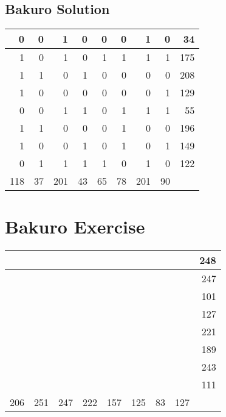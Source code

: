 \documentclass[]{article}
\begin{document}
 \subsection{Bakuro Solution} 
\begin{tabular}{rrrrrrrrr}
\hline
   0 &  0 &   1 &  0 &  0 &  0 &   1 &  0 &  34 \\ \hline
   1 &  0 &   1 &  0 &  1 &  1 &   1 &  1 & 175 \\ \hline
   1 &  1 &   0 &  1 &  0 &  0 &   0 &  0 & 208 \\ \hline
   1 &  0 &   0 &  0 &  0 &  0 &   0 &  1 & 129 \\ \hline
   0 &  0 &   1 &  1 &  0 &  1 &   1 &  1 &  55 \\ \hline
   1 &  1 &   0 &  0 &  0 &  1 &   0 &  0 & 196 \\ \hline
   1 &  0 &   0 &  1 &  0 &  1 &   0 &  1 & 149 \\ \hline
   0 &  1 &   1 &  1 &  1 &  0 &   1 &  0 & 122 \\ \hline
 118 & 37 & 201 & 43 & 65 & 78 & 201 & 90 &     \\ \hline
\hline
\end{tabular}\newpage\section{Bakuro Exercise}\begin{tabular}{rrrrrrrrr}
\hline
     &     &     &     &     &     &    &     & 248 \\ \hline
     &     &     &     &     &     &    &     & 247 \\ \hline
     &     &     &     &     &     &    &     & 101 \\ \hline
     &     &     &     &     &     &    &     & 127 \\ \hline
     &     &     &     &     &     &    &     & 221 \\ \hline
     &     &     &     &     &     &    &     & 189 \\ \hline
     &     &     &     &     &     &    &     & 243 \\ \hline
     &     &     &     &     &     &    &     & 111 \\ \hline
 206 & 251 & 247 & 222 & 157 & 125 & 83 & 127 &     \\ \hline
\hline
\end{tabular}\newpage 
\end{document}
